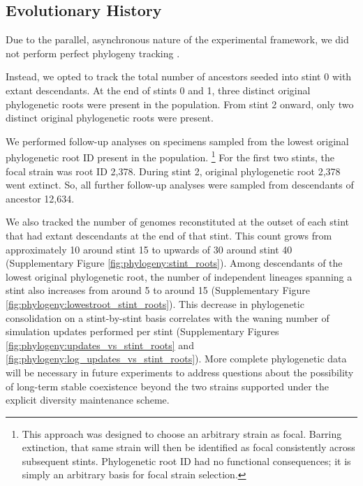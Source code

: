 \subsection{Evolutionary History}

Due to the parallel, asynchronous nature of the experimental framework, we did not perform perfect phylogeny tracking \citep{moreno2024analysis}.

Instead, we opted to track the total number of ancestors seeded into stint 0 with extant descendants.
At the end of stints 0 and 1, three distinct original phylogenetic roots were present in the population.
From stint 2 onward, only two distinct original phylogenetic roots were present.

We performed follow-up analyses on specimens sampled from the lowest original phylogenetic root ID present in the population.%
\footnote{
This approach was designed to choose an arbitrary strain as focal.
Barring extinction, that same strain will then be identified as focal consistently across subsequent stints.
Phylogenetic root ID had no functional consequences; it is simply an arbitrary basis for focal strain selection.
}
For the first two stints, the focal strain was root ID 2,378.
During stint 2, original phylogenetic root 2,378 went extinct.
So, all further follow-up analyses were sampled from descendants of ancestor 12,634.

We also tracked the number of genomes reconstituted at the outset of each stint that had extant descendants at the end of that stint.
This count grows from approximately 10 around stint 15 to upwards of 30 around stint 40 (Supplementary Figure \ref{fig:phylogeny:stint_roots}).
Among descendants of the lowest original phylogenetic root, the number of independent lineages spanning a stint also increases from around 5 to around 15
(Supplementary Figure \ref{fig:phylogeny:lowestroot_stint_roots}).
This decrease in phylogenetic consolidation on a stint-by-stint basis correlates with the waning number of simulation updates performed per stint (Supplementary Figures \ref{fig:phylogeny:updates_vs_stint_roots} and \ref{fig:phylogeny:log_updates_vs_stint_roots}).
More complete phylogenetic data will be necessary in future experiments to address questions about the possibility of long-term stable coexistence beyond the two strains supported under the explicit diversity maintenance scheme.

